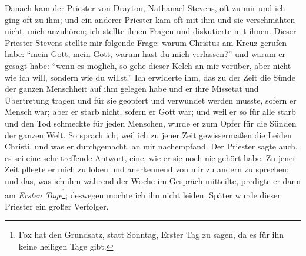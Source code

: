 Danach kam der Priester von Drayton, Nathanael Stevens,
oft zu mir und ich ging oft zu ihm; und ein anderer Priester
kam oft mit ihm und sie verschmähten nicht, mich anzuhören; ich
stellte ihnen Fragen und diskutierte mit ihnen. Dieser Priester
Stevens stellte mir folgende Frage: warum Christus am Kreuz
gerufen habe: "`mein Gott, mein Gott, warum hast du mich verlassen?"' 
und warum er gesagt habe: "`wenn es möglich, so gehe
dieser Kelch an mir vorüber, aber nicht wie ich will, sondern wie
du willst."' Ich erwiderte ihm, das zu der Zeit die Sünde der
ganzen Menschheit auf ihm gelegen habe und er ihre Missetat
und Übertretung tragen und für sie geopfert und verwundet
werden musste, sofern er Mensch war; aber er starb nicht, sofern
er Gott war; und weil er so für alle starb und den Tod schmeckte
für jeden Menschen, wurde er zum Opfer für die Sünden der
ganzen Welt. So sprach ich, weil ich zu jener Zeit gewissermaßen 
die Leiden Christi, und was er durchgemacht, an mir
nachempfand. Der Priester sagte auch, es sei eine sehr treffende
Antwort, eine, wie er sie noch nie gehört habe. Zu jener Zeit
pflegte er mich zu loben und anerkennend von mir zu andern zu
sprechen; und das, was ich ihm während der Woche im Gespräch
mitteilte, predigte er dann am \textit{Ersten Tage}\footnote{Fox 
hat den Grundsatz, statt Sonntag, Erster Tag zu sagen, da es für
ihn keine heiligen Tage gibt.}; deswegen mochte
ich ihn nicht leiden. Später wurde dieser Priester ein großer
Verfolger.

